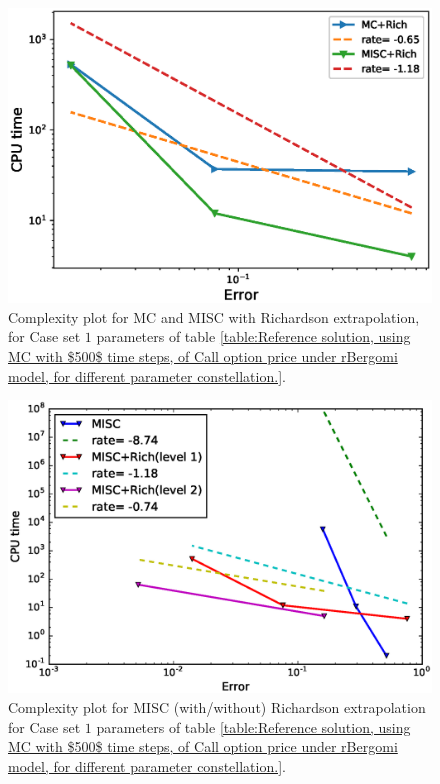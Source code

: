 \documentclass[11pt]{article}
\begin{document}
\begin{figure}[h!]
	\centering
	\includegraphics[width=0.7\linewidth]{./figures/rBergomi_Complexity_rates/set1/error_vs_time_set1_rich}
	
	\caption{Complexity plot for  MC and MISC with Richardson extrapolation, for Case set $1$ parameters of table \ref{table:Reference solution, using MC with $500$ time steps, of Call option price under rBergomi model, for different parameter constellation.}.}
	\label{fig:Complexity plot for MC and MISC for Case set $1$ parameters, richardson}
\end{figure}


\begin{figure}[h!]
	\centering
	\includegraphics[width=0.7\linewidth]{./figures/rBergomi_Complexity_rates/set1/error_vs_time_set1_comparison}
	
	\caption{Complexity plot for  MISC (with/without) Richardson extrapolation for Case set $1$ parameters of table \ref{table:Reference solution, using MC with $500$ time steps, of Call option price under rBergomi model, for different parameter constellation.}.}
	\label{fig:Complexity plot for  MISC for Case set $1$ parameters, comparison}
\end{figure}
\end{document}
